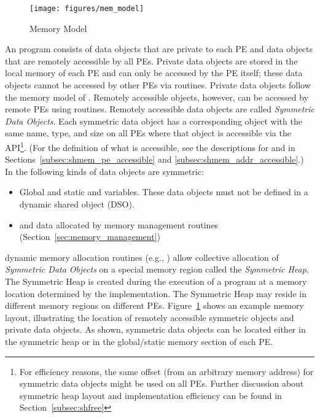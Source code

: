 \begin{figure}[h]
\texttt{[image: figures/mem\_model]}
\caption{\openshmem Memory Model}
\label{fig:mem_model}
\end{figure}
%
An \openshmem program consists of data objects that are private to each \ac{PE}
and data  objects that are remotely accessible by all \acp{PE}. Private data
objects are stored in the local memory of each \ac{PE} and can only be accessed
by the \ac{PE} itself; these data objects cannot be accessed by other \acp{PE}
via \openshmem routines. Private data objects follow the memory model of
\Cstd. Remotely accessible objects, however, can be accessed by
remote \acp{PE} using \openshmem routines.  Remotely accessible data objects are
called \emph{Symmetric Data Objects}.  Each symmetric data object has a
corresponding object with the same name, type, and size on all \acp{PE} where that object is
accessible via the \openshmem \ac{API}\footnote{For efficiency reasons,
the same offset (from an arbitrary memory address) for symmetric data
objects might be used on all \acp{PE}. Further discussion about symmetric heap
layout and implementation efficiency can be found in Section~\ref{subsec:shfree}}.
(For the definition of what is accessible, see the
descriptions for  and 
in Sections~\ref{subsec:shmem_pe_accessible} and
\ref{subsec:shmem_addr_accessible}.) In \openshmem the following kinds of
data objects are symmetric:
%
\begin{itemize}
\item Global and static \Cstd and \Cpp variables. These data objects must
  not be defined in a dynamic shared object (DSO).
\item \Cstd and \Cpp data allocated by \openshmem memory management routines
  (Section~\ref{sec:memory_management})
\end{itemize}

\openshmem dynamic memory allocation routines (e.g.,
) allow collective allocation of \emph{Symmetric Data
Objects} on a special memory region called the \emph{Symmetric Heap}. The
Symmetric Heap is created during the execution of a program at a memory location
determined by the implementation. The Symmetric Heap may reside in different
memory regions on different \acp{PE}.
Figure~\ref{fig:mem_model} shows an example \openshmem
memory layout, illustrating the location of remotely accessible symmetric
objects and private data objects.  As shown, symmetric data objects can be
located either in the symmetric heap or in the global/static memory section of
each \ac{PE}.

